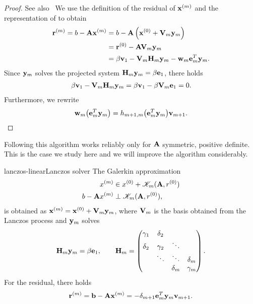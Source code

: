\begin{proof}
  See also~\cite[Proposition 6.7]{Saad00}
  We use the definition of the residual of $\mathbf x^{(m)}$ and the representation of  to obtain
  \begin{align}
    \mathbf r^{(m)} = b-\mathbf A\mathbf x^{(m)}
    &= b- \mathbf A\left(\mathbf x^{(0)} + \mathbf V_m\mathbf y_m\right)\\
    &=\mathbf r^{(0)} - \mathbf A\mathbf V_m\mathbf y_m\\
    &= \beta\mathbf v_1 - \mathbf V_m\mathbf H_m\mathbf y_m - \mathbf w_m\mathbf e_m^T\mathbf y_m.
  \end{align}
  Since $\mathbf y_m$ solves the projected system
  $\mathbf H_m\mathbf y_m = \beta\mathbf e_1$, there holds
  \begin{gather}
    \beta\mathbf v_1 - \mathbf V_m\mathbf H_m\mathbf y_m = \beta\mathbf v_1 - \beta \mathbf V_m\mathbf e_1 = 0.
  \end{gather}
  Furthermore, we rewrite
  \begin{gather}
    \mathbf w_m\bigl(\mathbf e_m^T\mathbf y_m\bigr) = h_{m+1,m} \bigl(\mathbf e_m^T\mathbf y_m\bigr) \mathbf v_{m+1}.
  \end{gather}
\end{proof}

\begin{remark}
  Following  this algorithm
  works reliably only for $\mathbf A$ symmetric, positive definite. This
  is the case we study here and we will improve the algorithm
  considerably.
\end{remark}

\begin{Lemma*}{lanczos-linear}{Lanczos solver}
  The Galerkin approximation   \begin{align}
    x^{(m)} &\in x^{(0)} + \mathscr K_m(\mathbf A,r^{(0)})\\
    b-\mathbf A x^{(m)} &\perp \mathscr K_m(\mathbf A,r^{(0)}),
  \end{align}
  is obtained as $\mathbf x^{(m)} = \mathbf x^{(0)} + \mathbf V_m \mathbf y_m$, where $\mathbf V_m$ is the basis obtained from the Lanczos process and $\mathbf y_m$ solves
  \begin{gather}
    \mathbf H_m\mathbf y_m = \beta\mathbf e_1,
    \qquad \mathbf H_m =
    \begin{pmatrix}
      \gamma_1 & \delta_2\\
      \delta_2 & \gamma_2 & \ddots\\
      &\ddots&\ddots&\delta_m\\
      &&\delta_{m}&\gamma_m
    \end{pmatrix}.
  \end{gather}
  For the residual, there holds
  \begin{gather}
    \mathbf r^{(m)} = \mathbf b-\mathbf A\mathbf x^{(m)} = -\delta_{m+1} \mathbf e_m^T \mathbf y_m \mathbf v_{m+1}.
  \end{gather}
\end{Lemma*}

